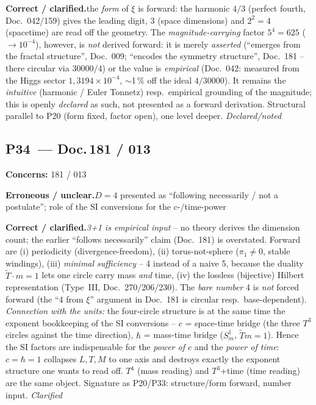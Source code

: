 \smallskip\noindent\textbf{Correct / clarified.}\quad the \emph{form} of $\xi$ is forward: the harmonic $4/3$ (perfect fourth, Doc.~042/159) gives the leading digit, $3$ (space dimensions) and $2^2{=}4$ (spacetime) are read off the geometry. The \emph{magnitude-carrying} factor $5^4{=}625$ ($\to 10^{-4}$), however, is \emph{not} derived forward: it is merely \emph{asserted} (\enquote{emerges from the fractal structure}, Doc.~009; \enquote{encodes the symmetry structure}, Doc.~181 -- there circular via $30000/4$) or the value is \emph{empirical} (Doc.~042: measured from the Higgs sector $1{,}3194\times10^{-4}$, $\sim$1\,\% off the ideal $4/30000$). It remains the \emph{intuitive} (harmonic / Euler Tonnetz) resp.\ empirical grounding of the magnitude; this is openly \emph{declared} as such, not presented as a forward derivation. Structural parallel to P20 (form fixed, factor open), one level deeper. \emph{Declared/noted}


\medskip


\subsection*{P34~--- Doc.\,181 / 013}

\noindent\textbf{Concerns:} 181 / 013


\smallskip\noindent\textbf{Erroneous / unclear.}\quad $D=4$ presented as \enquote{following necessarily / not a postulate}; role of the SI conversions for the c-/time-power


\smallskip\noindent\textbf{Correct / clarified.}\quad \emph{3+1 is empirical input} -- no theory derives the dimension count; the earlier \enquote{follows necessarily} claim (Doc.~181) is overstated. Forward are (i) periodicity (divergence-freedom), (ii) torus-not-sphere ($\pi_1\neq0$, stable windings), (iii) \emph{minimal sufficiency} -- 4 instead of a naive 5, because the duality $\tilde T\cdot m=1$ lets one circle carry mass \emph{and} time, (iv) the lossless (bijective) Hilbert representation (Type~III, Doc.~270/206/230). The \emph{bare number} 4 is \emph{not} forced forward (the \enquote{4 from $\xi$} argument in Doc.~181 is circular resp.\ base-dependent). \emph{Connection with the units:} the four-circle structure is at the same time the exponent bookkeeping of the SI conversions -- $c$ = space-time bridge (the three $T^3$ circles against the time direction), $\hbar$ = mass-time bridge ($S^1_m$, $\tilde T m=1$). Hence the SI factors are indispensable for the \emph{power of $c$} and the \emph{power of time}: $c=\hbar=1$ collapses $L,T,M$ to one axis and destroys exactly the exponent structure one wants to read off. $T^4$ (mass reading) and $T^3$+time (time reading) are the same object. Signature as P20/P33: structure/form forward, number input. \emph{Clarified}


